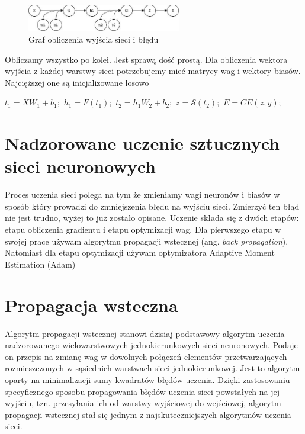 \documentclass{article}
\begin{document}
\begin{figure}[H]
	\centering
	\includegraphics[width=0.6\textwidth,keepaspectratio=true]{feed_forward_graph}
	\caption{
		Graf obliczenia wyjścia sieci i błędu  
	}
	\label{feed_forward_graph}
\end{figure}


Obliczamy wszystko po kolei. Jest sprawą dość prostą. Dla obliczenia wektora wyjścia z każdej warstwy sieci potrzebujemy mieć matrycy wag i wektory biasów. Najcięższej one są inicjalizowane losowo

\begin{flushleft}
$t_1 = XW_1 + b_1;$\newline
$h_1 = F(t_1);$\newline
$t_2 = h_1W_2 + b_2;$\newline
$z = \mathcal{S}(t_2);$\newline
$E = CE(z,y);$

\end{flushleft}


\section{Nadzorowane uczenie sztucznych sieci neuronowych}
Proces uczenia sieci polega na tym że zmieniamy wagi neuronów i biasów w sposób który prowadzi do zmniejszenia błędu na wyjściu sieci. Zmierzyć ten błąd nie jest trudno, wyżej to już zostało opisane. Uczenie składa się z dwóch etapów: etapu obliczenia gradientu i etapu optymizacji wag. 
Dla pierwszego etapu w swojej prace używam algorytmu propagacji wstecznej (ang. \textit{back propagation}). Natomiast dla etapu optymizacji używam optymizatora Adaptive Moment Estimation (Adam)

\section{Propagacja wsteczna}
Algorytm propagacji wstecznej stanowi dzisiaj podstawowy algorytm uczenia nadzorowanego wielowarstwowych jednokierunkowych sieci neuronowych. Podaje on przepis na zmianę wag w dowolnych połączeń elementów przetwarzających rozmieszczonych w sąsiednich warstwach sieci jednokierunkowej. Jest to algorytm oparty na minimalizacji sumy kwadratów błędów uczenia. Dzięki zastosowaniu specyficznego sposobu propagowania błędów uczenia sieci powstałych na jej wyjściu, tzn. przesyłania ich od warstwy wyjściowej do wejściowej, algorytm propagacji wstecznej stał się jednym z najskuteczniejszych algorytmów uczenia sieci. \cite{nn_jozef}
\end{document}
